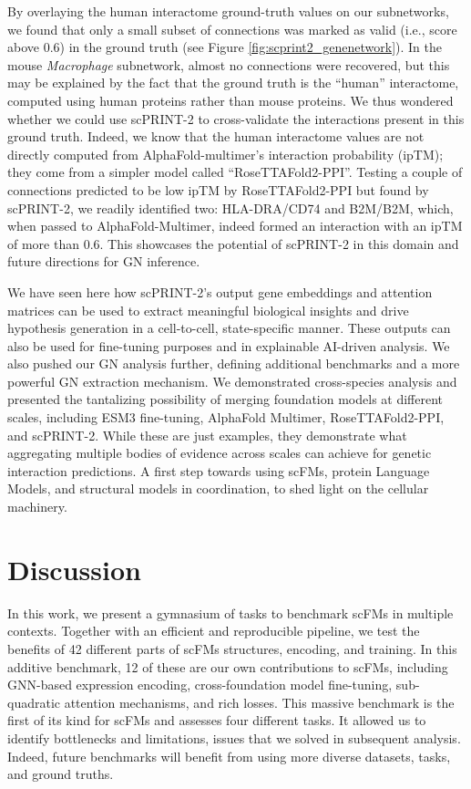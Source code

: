 By overlaying the human interactome ground-truth values on our
subnetworks, we found that only a small subset of connections was marked
as valid (i.e., score above 0.6) in the ground truth (see Figure \ref{fig:scprint2_genenetwork}). In
the mouse \emph{Macrophage} subnetwork, almost no connections were
recovered, but this may be explained by the fact that the ground truth
is the ``human'' interactome, computed using human proteins rather than
mouse proteins. We thus wondered whether we could use \gls{scPRINT}-2 to
cross-validate the interactions present in this ground truth. Indeed, we
know that the human interactome values are not directly computed from
AlphaFold-multimer's interaction probability (\gls{ipTM}); they come from a
simpler model called ``RoseTTAFold2-PPI''. Testing a couple of
connections predicted to be low \gls{ipTM} by RoseTTAFold2-PPI but found by
\gls{scPRINT}-2, we readily identified two: HLA-DRA/CD74 and B2M/B2M, which,
when passed to AlphaFold-Multimer, indeed formed an interaction with an
\gls{ipTM} of more than 0.6. This showcases the potential of \gls{scPRINT}-2 in this
domain and future directions for \gls{GN} inference.

We have seen here how \gls{scPRINT}-2's output gene embeddings and attention
matrices can be used to extract meaningful biological insights and drive
hypothesis generation in a cell-to-cell, state-specific manner. These
outputs can also be used for fine-tuning purposes and in explainable
AI-driven analysis. We also pushed our \gls{GN} analysis further, defining
additional benchmarks and a more powerful \gls{GN} extraction mechanism. We
demonstrated cross-species analysis and presented the tantalizing
possibility of merging foundation models at different scales, including
\gls{ESM}3 fine-tuning, AlphaFold Multimer, RoseTTAFold2-PPI, and \gls{scPRINT}-2.
While these are just examples, they demonstrate what aggregating
multiple bodies of evidence across scales can achieve for genetic
interaction predictions. A first step towards using \gls{scFM}s, protein
Language Models, and structural models in coordination, to shed light on
the cellular machinery.

\section{Discussion}\label{discussion}

In this work, we present a gymnasium of tasks to benchmark \gls{scFM}s in
multiple contexts. Together with an efficient and reproducible pipeline,
we test the benefits of 42 different parts of \gls{scFM}s structures,
encoding, and training. In this additive benchmark, 12 of these are our
own contributions to \gls{scFM}s, including \gls{GNN}-based expression encoding,
cross-foundation model fine-tuning, sub-quadratic attention mechanisms,
and rich losses. This massive benchmark is the first of its kind for
\gls{scFM}s and assesses four different tasks. It allowed us to identify
bottlenecks and limitations, issues that we solved in subsequent
analysis. Indeed, future benchmarks will benefit from using more diverse
datasets, tasks, and ground truths.

